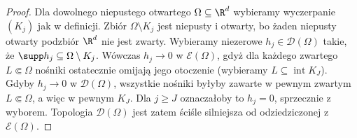 \begin{proof}
Dla dowolnego niepustego otwartego $\Omega\subseteq\R^d$
wybieramy wyczerpanie $(K_j)$ jak w definicji.
Zbiór $\Omega\setminus K_j$ jest niepusty i otwarty,
bo żaden niepusty otwarty podzbiór $\R^d$ nie jest zwarty.
Wybieramy niezerowe $h_j\in\mathcal D(\Omega)$ takie,
że $\supp h_j\subseteq\Omega\setminus K_j$.
Wówczas $h_j\to0$ w $\mathcal E(\Omega)$, gdyż dla
każdego zwartego $L\Subset\Omega$ nośniki ostatecznie
omijają jego otoczenie (wybieramy $L\subseteq\operatorname{int}K_J$).
Gdyby $h_j\to0$ w $\mathcal D(\Omega)$, wszystkie nośniki
byłyby zawarte w pewnym zwartym $L\Subset\Omega$,
a więc w pewnym $K_J$. Dla $j\ge J$ oznaczałoby to
$h_j=0$, sprzecznie z wyborem. Topologia $\mathcal D(\Omega)$
jest zatem ściśle silniejsza od odziedziczonej z $\mathcal E(\Omega)$.
\end{proof}
